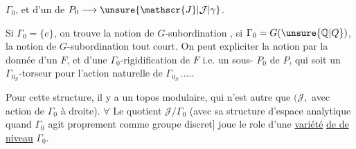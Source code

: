  $\Gamma_0$, et d'un  de $P_0\longrightarrow\unsure{\mathscr{J}|\mathcal{J}|\gamma}$.

Si $\Gamma_0=\{e\}$, on trouve la notion de $G$-subordination , si $\Gamma_0=G(\unsure{\mathbb{Q}|Q})$, la notion de $G$-subordination tout court. On peut expliciter la notion par la donnée d'un $F$, et d'une  $\Gamma_0$-rigidification de $F$ i.e. un sous- $P_0$ de $P$, qui soit un  $\Gamma_{0_S}$-torseur pour l'action naturelle de $\Gamma_{0_S}$\,.....

Pour cette structure, il y a un topos modulaire, qui n'est autre que  $(\mathscr{J},$ avec action de $\Gamma_0$ à droite). $\forall$ Le quotient $\mathscr{J}/\Gamma_0$ (avec sa structure d'espace analytique quand $\Gamma_0$ agit proprement comme groupe discret]  joue le role d'une \uline{variété} \uline{de } \uline{de niveau} $\Gamma_0$.
